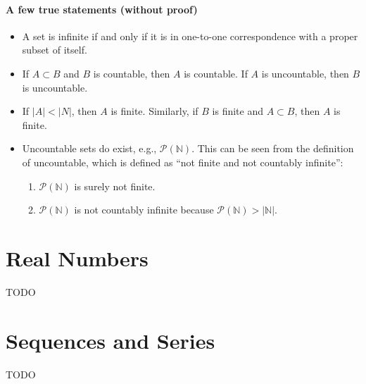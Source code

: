 \documentclass[12pt, letterpaper, oneside]{book}
\begin{document}
\subsubsection{A few true statements (without proof)}

\begin{itemize}
  \item A set is infinite if and only if it is in one-to-one correspondence
        with a proper subset of itself.
  \item If $A \subset B$ and $B$ is countable, then $A$ is countable. If $A$ is
        uncountable, then $B$ is uncountable.
  \item If $|A| < |N|$, then $A$ is finite. Similarly, if $B$ is finite and $A
          \subset B$, then $A$ is finite.
  \item Uncountable sets do exist, e.g., $\mathcal{P}(\mathbb{N})$. This can be
        seen from the definition of uncountable, which is defined as ``not finite
        and not countably infinite'':
        \begin{enumerate}
          \item $\mathcal{P}(\mathbb{N})$ is surely not finite.
          \item $\mathcal{P}(\mathbb{N})$ is not countably infinite because
                $\mathcal{P}(\mathbb{N}) > |\mathbb{N}|$.
        \end{enumerate}
\end{itemize}

%
%

\chapter{Real Numbers}

TODO

%
%

\chapter{Sequences and Series}

TODO
\end{document}
